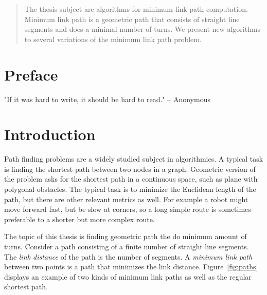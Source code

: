 \documentclass[english,gradu]{tktltiki2018}
\begin{document}
\begin{abstract}
The thesis subject are algorithms for minimum link path computation.
Minimum link path is a geometric path that consists of straight line segments and does a minimal number of turns.
We present new algorithms to several variations of the minimum link path problem.
\end{abstract}

\mytableofcontents


\setcounter{section}{-1}
\section{Preface}

"If it was hard to write, it should be hard to read." -- Anonymous

\section{Introduction}

Path finding problems are a widely studied subject in algorithmics.\cite{survey}
A typical task is finding the shortest path between two nodes in a graph.
Geometric version of the problem asks for the shortest path in a continuous space, such as plane with polygonal obstacles.
The typical task is to minimize the Euclidean length of the path, but there are other relevant metrics as well.
For example a robot might move forward fast, but be slow at corners, so a long simple route is sometimes preferable to a shorter but more complex route.

The topic of this thesis is finding geometric path the do minimum amount of turns.
Consider a path consisting of a finite number of straight line segments.
The \emph{link distance} of the path is the number of segments.
A \emph{minimum link path} between two points is a path that minimizes the link distance.
Figure~\ref{fig:paths} displays an example of two kinds of minimum link paths as well as the regular shortest path.
\end{document}
